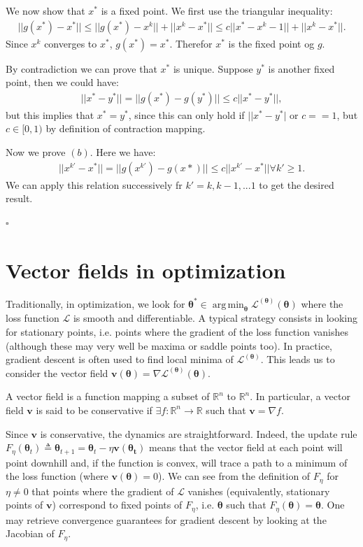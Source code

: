 \documentclass{article}
\DeclareMathOperator*{\argmin}{arg\,min}
\renewcommand{\vec}[1]{\ensuremath{\boldsymbol{#1}}}
\newcommand{\btheta}[0]{\ensuremath{\boldsymbol{\theta}}}
\begin{document}
We now show that $x^*$ is a fixed point. We first use the triangular inequality:
\begin{align*}
    ||g(x^*)-x^*|| \leq ||g(x^*)-x^k||+||x^k-x^*|| \leq c||x^*-x^k-1||+||x^k-x^*||.
\end{align*}
Since $x^k$ converges to $x^*$, $g(x^*) = x^*$. Therefor $x^*$ is the fixed point og $g$.

By contradiction we can prove that $x^*$ is unique. Suppose $y^*$ is another fixed point, then we could have:
\begin{align*}
    ||x^*-y^*||=||g(x^*)-g(y^*)|| \leq c||x^*-y^*||,
\end{align*}
but this implies that $x^*=y^*$, since this can only hold if $||x^*-y^*|$ or $c==1$, but $c\in [0,1)$ by definition of contraction mapping.

Now we prove $(b)$. Here we have:
\begin{align*}
    ||x^{k'}-x^*||=||g(x^{k'})-g(x*)|| \leq c||x^{k'}-x^*|| \forall k' \geq 1.
\end{align*}
We can apply this relation successively fr $k'=k,k-1,...1$ to get the desired result.

\hfill$\square$

\section{Vector fields in optimization}
Traditionally, in optimization, we look for $\btheta^* \in \argmin_{\btheta}\mathcal{L}^{(\btheta)}(\btheta)$ where the loss function $\mathcal{L}$ is smooth and differentiable. A typical strategy consists in looking for stationary points, i.e. points where the gradient of the loss function vanishes (although these may very well be maxima or saddle points too). In practice, gradient descent is often used to find local minima of $\mathcal{L}^{(\btheta)}$. This leads us to consider the vector field $\vec{v}(\btheta)=\nabla\mathcal{L}^{(\btheta)}(\btheta)$.
\begin{defn}
    A vector field is a function mapping a subset of $\mathbb{R}^n$ to $\mathbb{R}^n$. In particular, a vector field $\vec{v}$ is said to be conservative if $\exists f: \mathbb{R}^n \rightarrow \mathbb{R}$ such that $\vec{v} = \nabla f$.
\end{defn}

Since $\vec{v}$ is conservative, the dynamics are straightforward. Indeed, the update rule $F_\eta(\btheta_t) \triangleq \btheta_{t+1} = \btheta_t - \eta \vec{v}(\vec{\btheta_t})$ means that the vector field at each point will point downhill and, if the function is convex, will trace a path to a minimum of the loss function (where $\vec{v}(\btheta) = 0$). We can see from the definition of $F_\eta$ for $\eta \neq 0$ that points where the gradient of $\mathcal{L}$ vanishes (equivalently, stationary points of $\vec{v}$) correspond to fixed points of $F_\eta$, i.e. $\btheta$ such that $F_\eta(\btheta) = \btheta$. One may retrieve convergence guarantees for gradient descent by looking at the Jacobian of $F_\eta$.
\end{document}

